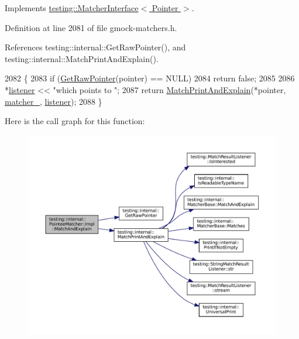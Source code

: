 Implements \hyperlink{classtesting_1_1MatcherInterface_a296b43607cd99d60365f0e6a762777cf}{testing\+::\+Matcher\+Interface$<$ Pointer $>$}.



Definition at line 2081 of file gmock-\/matchers.\+h.



References testing\+::internal\+::\+Get\+Raw\+Pointer(), and testing\+::internal\+::\+Match\+Print\+And\+Explain().


\begin{DoxyCode}
2082                                                                       \{
2083       \textcolor{keywordflow}{if} (\hyperlink{namespacetesting_1_1internal_ae88d1a6f95165c43c27a6c0e2d357e61}{GetRawPointer}(pointer) == NULL)
2084         \textcolor{keywordflow}{return} \textcolor{keyword}{false};
2085 
2086       *\hyperlink{namespaceinteractive__marker_a0e579ab555212bb5e2c9f8a675b7618a}{listener} << \textcolor{stringliteral}{"which points to "};
2087       \textcolor{keywordflow}{return} \hyperlink{namespacetesting_1_1internal_a0821df2611d54c79bac990719ad8a2dd}{MatchPrintAndExplain}(*pointer, \hyperlink{classtesting_1_1internal_1_1PointeeMatcher_1_1Impl_a8b6095eca981f76156d7e301cef455a0}{matcher\_}, 
      \hyperlink{namespaceinteractive__marker_a0e579ab555212bb5e2c9f8a675b7618a}{listener});
2088     \}
\end{DoxyCode}
Here is the call graph for this function\+:
\nopagebreak
\begin{figure}[H]
\begin{center}
\leavevmode
\includegraphics[width=350pt]{classtesting_1_1internal_1_1PointeeMatcher_1_1Impl_a2aeaf0b7284fb2c7a7745746ec6ce63b_cgraph}
\end{center}
\end{figure}


